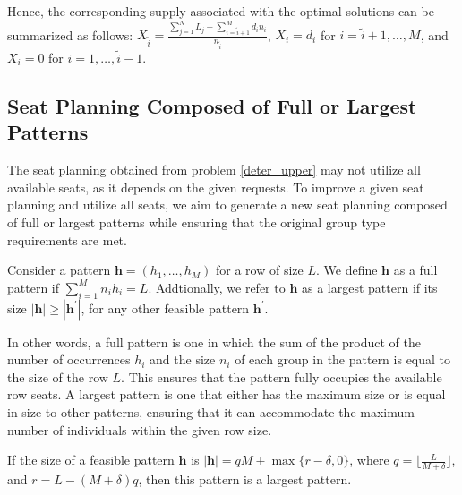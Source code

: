 Hence, the corresponding supply associated with the optimal solutions can be summarized as follows: $X_{\tilde{i}} = \frac{\sum_{j=1}^{N}L_{j} - \sum_{i = \tilde{i}+1}^{M} {d_i n_i}}{n_{\tilde{i}}}$, $X_{i} = d_{i}$ for $i = \tilde{i} +1,\ldots, M$, and $X_{i} = 0$ for $i = 1, \ldots, \tilde{i}-1$.

\subsection{Seat Planning Composed of Full or Largest Patterns}
The seat planning obtained from problem \eqref{deter_upper} may not utilize all available seats, as it depends on the given requests. To improve a given seat planning and utilize all seats, we aim to generate a new seat planning composed of full or largest patterns while ensuring that the original group type requirements are met.

\begin{definition}
Consider a pattern $\bm{h} = (h_1, \ldots, h_M)$ for a row of size $L$. We define $\bm{h}$ as a full pattern if $\sum_{i=1}^{M} n_i h_i = L$. Addtionally, we refer to $\bm{h}$ as a largest pattern if its size $|\bm{h}| \geq |\bm{h}^{\prime}|$, for any other feasible pattern $\bm{h}^{\prime}$.
\end{definition}

In other words, a full pattern is one in which the sum of the product of the number of occurrences $h_i$ and the size $n_i$ of each group in the pattern is equal to the size of the row $L$. This ensures that the pattern fully occupies the available row seats. A largest pattern is one that either has the maximum size or is equal in size to other patterns, ensuring that it can accommodate the maximum number of individuals within the given row size.


\begin{prop}\label{lem_pattern}
If the size of a feasible pattern $\bm{h}$ is $|\bm{h}| = qM + \max\{r-\delta, 0\}$, where $q = \lfloor \frac{L}{M + \delta} \rfloor$, and $r = L - (M + \delta) q$, then this pattern is a largest pattern.
\end{prop}



